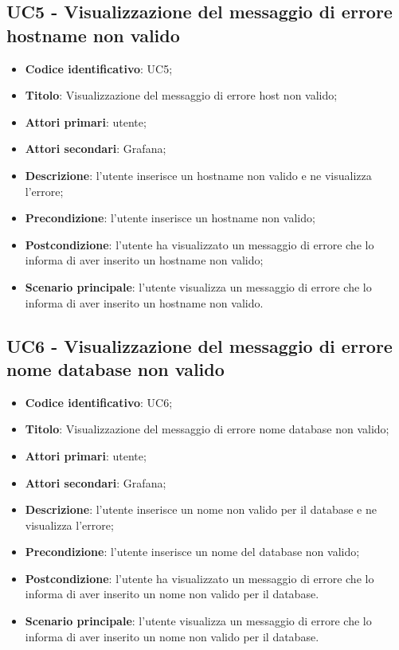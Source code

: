 \subsection{UC5 - Visualizzazione del messaggio di errore hostname non valido}
\begin{itemize}
	\item \textbf{Codice identificativo}: UC5;
	\item \textbf{Titolo}: Visualizzazione del messaggio di errore host non valido;
	\item \textbf{Attori primari}: utente;
	\item \textbf{Attori secondari}: Grafana\glo;
	\item \textbf{Descrizione}: l'utente inserisce un hostname non valido e ne visualizza l'errore;
	\item \textbf{Precondizione}: l'utente inserisce un hostname non valido;
	\item \textbf{Postcondizione}: l'utente ha visualizzato un messaggio di errore che lo informa di aver inserito un hostname non valido;
	\item \textbf{Scenario principale}: l'utente visualizza un messaggio di errore che lo informa di aver inserito un hostname non valido.
\end{itemize}
		
\subsection{UC6 - Visualizzazione del messaggio di errore nome database non valido}
\begin{itemize}
	\item \textbf{Codice identificativo}: UC6;
	\item \textbf{Titolo}: Visualizzazione del messaggio di errore nome database non valido;
	\item \textbf{Attori primari}: utente;
	\item \textbf{Attori secondari}: Grafana\glo;
	\item \textbf{Descrizione}: l'utente inserisce un nome non valido per il database e ne visualizza l'errore;
	\item \textbf{Precondizione}: l'utente inserisce un nome del database non valido;
	\item \textbf{Postcondizione}: l'utente ha visualizzato un messaggio di errore che lo informa di aver inserito un nome non valido per il database.
	\item \textbf{Scenario principale}: l'utente visualizza un messaggio di errore che lo informa di aver inserito un nome non valido per il database.
\end{itemize}
		
